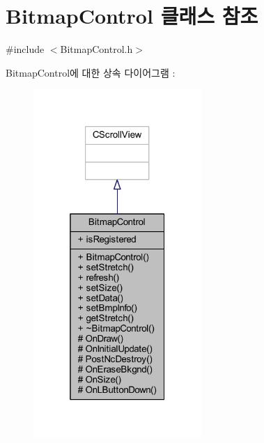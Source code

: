 \hypertarget{class_bitmap_control}{}\section{Bitmap\+Control 클래스 참조}
\label{class_bitmap_control}


{\ttfamily \#include $<$Bitmap\+Control.\+h$>$}



Bitmap\+Control에 대한 상속 다이어그램 \+: \nopagebreak
\begin{figure}[H]
\begin{center}
\leavevmode
\includegraphics[width=181pt]{class_bitmap_control__inherit__graph}
\end{center}
\end{figure}


